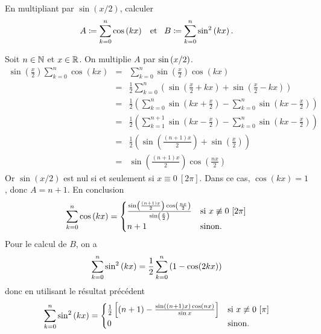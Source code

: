 \documentclass{magnoliaold}
\begin{document}

\begin{exoUnique}
\exo En multipliant par $\sin(x/2)$, calculer
  \[A\coloneqq\sum_{k=0}^n \cos\left(kx\right) \quad\!\text{et}\quad\! B\coloneqq\sum_{k=0}^n \sin^2\left(kx\right).\]
  \begin{sol}
  Soit $n\in\mathbb{N}$ et $x\in\mathbb{R}$. On multiplie $A$ par $\sin\left(x/2\right)$.
  \begin{eqnarray*}
  \sin\left( \frac{x}{2}\right)\sum_{k=0}^n \cos(kx)
  &=& \sum_{k=0}^n \sin\left( \frac{x}{2}\right)\cos (kx)\\
  &=& \frac{1}{2}\sum_{k=0}^n \left(\sin \left( \frac{x}{2}+kx\right) +\sin \left( \frac{x}{2}-kx\right) \right)\\
  &=& \frac{1}{2}\left( \sum_{k=0}^n \sin \left(kx+ \frac{x}{2}\right) -\sum_{k=0}^n \sin \left(kx- \frac{x}{2}\right)    \right)\\
  &=& \frac{1}{2}\left( \sum_{k=1}^{n+1} \sin \left(kx- \frac{x}{2}\right) -\sum_{k=0}^n \sin \left(kx- \frac{x}{2}\right)    \right)\\
  &=& \frac{1}{2}\left(\sin \left( \frac{(n+1)x}{2}\right) +\sin\left(  \frac{x}{2} \right) \right)\\
  &=& \sin \left(\frac{(n+1)x}{2}\right) \cos\left( \frac{nx}{2}\right)
  \end{eqnarray*}
  Or $\sin(x/2)$ est nul si et seulement si $x\equiv 0\ [2\pi]$. Dans ce cas, $\cos(kx)=1$, donc 
  $A=n+1$. En conclusion
  \[\sum_{k=0}^n \cos\left(kx\right)=
    \begin{cases}
    \frac{\sin\left(\frac{(n+1)x}{2}\right)\cos\left(\frac{nx}{2}\right)}{\sin\left(\frac{x}{2}\right)}
    & \text{si $x\not\equiv 0\ [2\pi]$}\\
    n+1 & \text{sinon.}
    \end{cases}\]
  Pour le calcul de $B$, on a
  \[\sum_{k=0}^n \sin^2\left(kx\right)=\frac{1}{2 } \sum_{k=0}^{n}\left( 1-\cos (2kx)\right)\]
  donc en utilisant le résultat précédent
  \[\sum_{k=0}^n \sin^2\left(kx\right)=
    \begin{cases}
    \frac{1}{2}\left[\left(n+1\right)-\frac{\sin((n+1)x)\cos(nx)}{\sin x}\right] &
      \text{si $x\not\equiv 0\ [\pi]$}\\
    0 & \text{sinon.}
    \end{cases}\]
  \end{sol}
\end{exoUnique}
\end{document}
